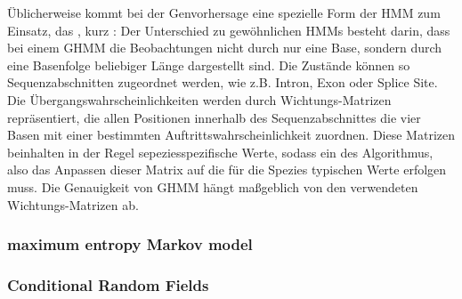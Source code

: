 Üblicherweise kommt bei der Genvorhersage eine spezielle Form der HMM zum
Einsatz, das , kurz :
Der Unterschied zu gewöhnlichen HMMs besteht darin, dass bei einem GHMM die
Beobachtungen nicht durch nur eine Base, sondern durch eine Basenfolge
beliebiger Länge dargestellt sind.
Die Zustände können so Sequenzabschnitten zugeordnet werden, wie z.B. Intron,
Exon oder Splice Site.
Die Übergangswahrscheinlichkeiten werden durch Wichtungs-Matrizen
repräsentiert, die allen Positionen innerhalb des Sequenzabschnittes die vier
Basen mit einer bestimmten Auftrittswahrscheinlichkeit zuordnen.
Diese Matrizen beinhalten in der Regel sepeziesspezifische Werte, sodass ein
 des Algorithmus, also das Anpassen dieser Matrix auf die für die
Spezies typischen Werte erfolgen muss.
Die Genauigkeit von GHMM hängt maßgeblich von den verwendeten
Wichtungs-Matrizen ab.
\citep{pmid16339376, pmid17687368, pmid10779491, durbin_biological_1998}

\subsubsection{maximum entropy Markov model}

\subsubsection{Conditional Random Fields}\label{chp:crf}
